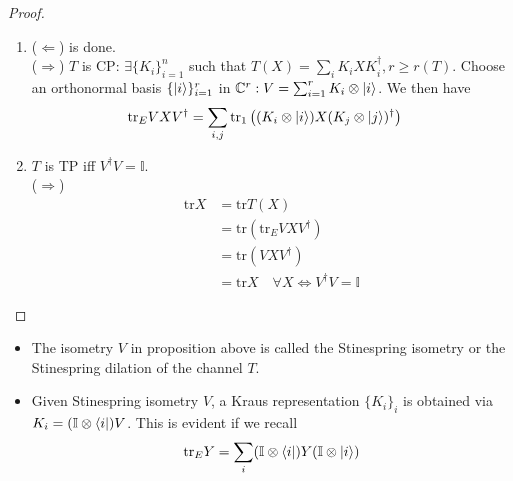 \documentclass[10pt,oneside,longbibliography]{report}
\begin{document}
\begin{tcolorbox}[colframe=black,breakable, colback=black!5, arc=0pt, outer arc=0pt,boxrule=0.5pt]
\begin{proof}
\begin{enumerate}
    \item ($\Leftarrow$) is done. \\
    ($\Rightarrow$) $T$ is CP: $\exists \{K_i\}_{i=1}^n$ such that $T(X) = \sum_i K_i X K_i^{\dagger}, r \geq r(T)$. Choose an orthonormal basis $\{\ket{i}\}_{i=1}^r$ in $\mathbb{C}^r: V=\sum_{i=1}^r K_i \otimes \ket{i}$. We then have 
    \begin{align}
        \text{tr}_E VXV^{\dagger} &= \sum_{i,j}\text{tr}_1 \left((K_i \otimes \ket{i})X(K_j \otimes \ket{j})^{\dagger}\right)
    \end{align}
    
    \item $T$ is TP iff $V^{\dagger}V=\mathbb{I}$. \\
    ($\Rightarrow$) 
    \begin{align}
         \text{tr}X &= \text{tr}T(X) \\
         &= \text{tr}\left(\text{tr}_E VXV^{\dagger}\right) \\
         &= \text{tr}(VXV^{\dagger})\\
         &=\text{tr} X \quad \forall X \Leftrightarrow V^{\dagger}V=\mathbb{I}
    \end{align}
\end{enumerate}
\end{proof}
\end{tcolorbox}

\begin{itemize}
    \item The isometry $V$ in proposition above is called the Stinespring isometry or the Stinespring dilation of the channel $T$. 
    \item Given Stinespring isometry $V$, a Kraus representation $\{K_i\}_i$ is obtained via $K_i=(\mathbb{I} \otimes \bra{i})V$. This is evident if we recall
    \begin{align}
        \text{tr}_E Y = \sum_i (\mathbb{I} \otimes \bra{i}) Y (\mathbb{I} \otimes \ket{i})
    \end{align}
\end{itemize}
\end{document}

